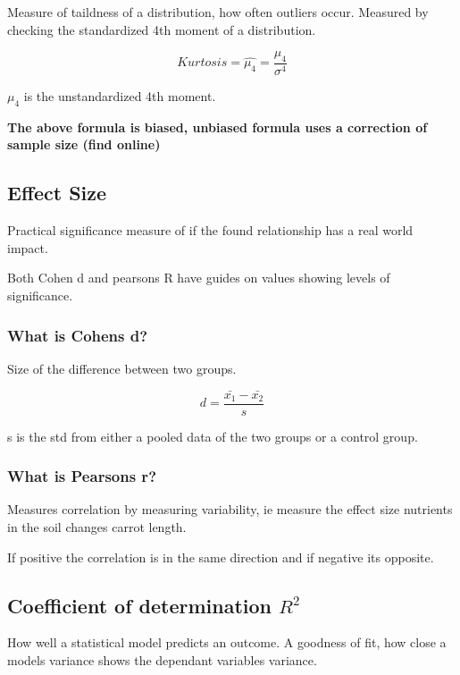 \documentclass[11pt]{scrartcl} %
\begin{document}
Measure of taildness of a distribution, how often outliers occur. Measured by checking the standardized 4th moment of a distribution.

\begin{equation}
	Kurtosis = \hat{\mu_4} = \frac{\mu_4}{\sigma^4}
\end{equation}

\(\mu_4\) is the unstandardized 4th moment.

\textbf{The above formula is biased, unbiased formula uses a correction of sample size (find online)}

\subsection{Effect Size}

Practical significance measure of if the found relationship has a real world impact.

Both Cohen d and pearsons R have guides on values showing levels of significance.

\subsubsection{What is Cohens d?}

Size of the difference between two groups.

\begin{equation}
	d = \frac{\bar{x_1} - \bar{x_2}}{s}
\end{equation}

s is the std from either a pooled data of the two groups or a control group.

\subsubsection{What is Pearsons r?}

Measures correlation by measuring variability, ie measure the effect size nutrients in the soil changes carrot length.

If positive the correlation is in the same direction and if negative its opposite.

\subsection{Coefficient of determination \(R^2\)}

How well a statistical model predicts an outcome. A goodness of fit, how close a models variance shows the dependant variables variance.\\
\end{document}
